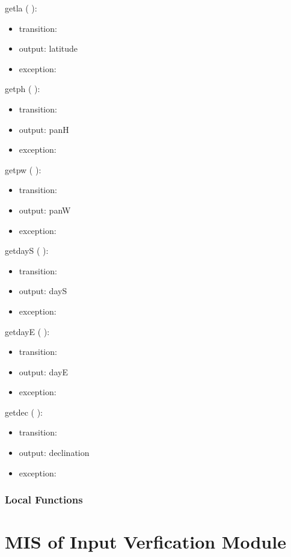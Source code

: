 \documentclass[12pt, titlepage]{article}
\begin{document}
\noindent  getla ( ):
\begin{itemize}
\item transition: 
\item output: latitude
\item exception: 
\end{itemize}

\noindent  getph ( ):
\begin{itemize}
\item transition: 
\item output: panH
\item exception: 
\end{itemize}

\noindent  getpw ( ):
\begin{itemize}
\item transition: 
\item output: panW
\item exception: 
\end{itemize}

\noindent  getdayS ( ):
\begin{itemize}
\item transition: 
\item output: dayS
\item exception: 
\end{itemize}

\noindent  getdayE ( ):
\begin{itemize}
\item transition: 
\item output: dayE
\item exception: 
\end{itemize}

\noindent  getdec ( ):
\begin{itemize}
\item transition: 
\item output: declination
\item exception: 
\end{itemize}

\subsubsection{Local Functions}



\newpage



\section{MIS of Input Verfication Module} \label{ModuleIV} 
\end{document}
